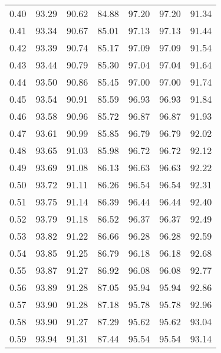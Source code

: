 \begin{tabular}{|c|c|c|c|c|c|c|}
      0.40 &     93.29 &     90.62 &      84.88 &   97.20 &      97.20 &         91.34 \\
      0.41 &     93.34 &     90.67 &      85.01 &   97.13 &      97.13 &         91.44 \\
      0.42 &     93.39 &     90.74 &      85.17 &   97.09 &      97.09 &         91.54 \\
      0.43 &     93.44 &     90.79 &      85.30 &   97.04 &      97.04 &         91.64 \\
      0.44 &     93.50 &     90.86 &      85.45 &   97.00 &      97.00 &         91.74 \\
      0.45 &     93.54 &     90.91 &      85.59 &   96.93 &      96.93 &         91.84 \\
      0.46 &     93.58 &     90.96 &      85.72 &   96.87 &      96.87 &         91.93 \\
      0.47 &     93.61 &     90.99 &      85.85 &   96.79 &      96.79 &         92.02 \\
      0.48 &     93.65 &     91.03 &      85.98 &   96.72 &      96.72 &         92.12 \\
      0.49 &     93.69 &     91.08 &      86.13 &   96.63 &      96.63 &         92.22 \\
      0.50 &     93.72 &     91.11 &      86.26 &   96.54 &      96.54 &         92.31 \\
      0.51 &     93.75 &     91.14 &      86.39 &   96.44 &      96.44 &         92.40 \\
      0.52 &     93.79 &     91.18 &      86.52 &   96.37 &      96.37 &         92.49 \\
      0.53 &     93.82 &     91.22 &      86.66 &   96.28 &      96.28 &         92.59 \\
      0.54 &     93.85 &     91.25 &      86.79 &   96.18 &      96.18 &         92.68 \\
      0.55 &     93.87 &     91.27 &      86.92 &   96.08 &      96.08 &         92.77 \\
      0.56 &     93.89 &     91.28 &      87.05 &   95.94 &      95.94 &         92.86 \\
      0.57 &     93.90 &     91.28 &      87.18 &   95.78 &      95.78 &         92.96 \\
      0.58 &     93.90 &     91.27 &      87.29 &   95.62 &      95.62 &         93.04 \\
      0.59 &     93.94 &     91.31 &      87.44 &   95.54 &      95.54 &         93.14 \\

\end{tabular}
